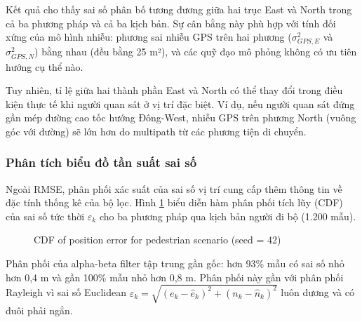 Kết quả cho thấy sai số phân bố tương đương giữa hai trục East và North trong cả ba phương pháp và cả ba kịch bản. Sự cân bằng này phù hợp với tính đối xứng của mô hình nhiễu: phương sai nhiễu GPS trên hai phương ($\sigma_{GPS,E}^2$ và $\sigma_{GPS,N}^2$) bằng nhau (đều bằng 25 m²), và các quỹ đạo mô phỏng không có ưu tiên hướng cụ thể nào.

Tuy nhiên, tỉ lệ giữa hai thành phần East và North có thể thay đổi trong điều kiện thực tế khi người quan sát ở vị trí đặc biệt. Ví dụ, nếu người quan sát đứng gần mép đường cao tốc hướng Đông-West, nhiễu GPS trên phương North (vuông góc với đường) sẽ lớn hơn do multipath từ các phương tiện di chuyển.

\subsubsection{Phân tích biểu đồ tần suất sai số}

\hspace{0.5cm} Ngoài RMSE, phân phối xác suất của sai số vị trí cung cấp thêm thông tin về đặc tính thống kê của bộ lọc. Hình \ref{fig:error-cdf-ped} biểu diễn hàm phân phối tích lũy (CDF) của sai số tức thời $\varepsilon_k$ cho ba phương pháp qua kịch bản người đi bộ (1.200 mẫu).

\begin{figure}[H]
\centering
{}
\caption{CDF of position error for pedestrian scenario (seed = 42)}
\label{fig:error-cdf-ped}
\end{figure}

Phân phối của alpha-beta filter tập trung gần gốc: hơn 93\% mẫu có sai số nhỏ hơn 0,4 m và gần 100\% mẫu nhỏ hơn 0,8 m. Phân phối này gần với phân phối Rayleigh vì sai số Euclidean $\varepsilon_k = \sqrt{(e_k - \hat{e}_k)^2 + (n_k - \hat{n}_k)^2}$ luôn dương và có đuôi phải ngắn.

